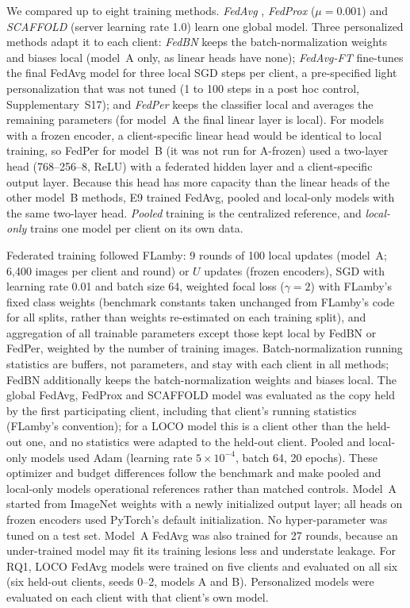\documentclass[VANCOUVER,Times1COL]{WileyNJDv5}
\begin{document}
We compared up to eight training methods. \emph{FedAvg} \cite{mcmahan2017fedavg}, \emph{FedProx}
\cite{li2020fedprox} ($\mu=0.001$) and \emph{SCAFFOLD} \cite{karimireddy2020scaffold} (server learning
rate 1.0) learn one global model. Three personalized methods adapt it to each client:
\emph{FedBN} \cite{li2021fedbn} keeps the batch-normalization weights and biases local (model~A only, as
linear heads have none); \emph{FedAvg-FT} fine-tunes the final FedAvg model for three local SGD steps per
client, a pre-specified light personalization that was not tuned (1 to 100 steps in a post hoc control,
Supplementary~S17); and \emph{FedPer}
\cite{arivazhagan2019fedper} keeps the classifier local and averages the remaining parameters (for
model~A the final linear layer is local). For models with a frozen encoder, a client-specific linear head
would be identical to local training, so FedPer for model~B (it was not run for A-frozen) used a two-layer head (768--256--8, ReLU) with a
federated hidden layer and a client-specific output layer. Because this head has more capacity than the
linear heads of the other model~B methods, E9 trained FedAvg, pooled and local-only models with the same
two-layer head. \emph{Pooled} training is the centralized reference, and \emph{local-only} trains one model
per client on its own data.

Federated training followed FLamby: 9 rounds of 100 local updates (model~A; 6,400 images per client and
round) or $U$ updates (frozen encoders), SGD with learning rate 0.01 and batch size 64, weighted focal loss
\cite{lin2017focal} ($\gamma=2$) with FLamby's fixed class weights (benchmark constants taken unchanged from FLamby's code for all splits, rather than weights re-estimated on each training split), and aggregation of all trainable parameters except those kept local by FedBN or FedPer, weighted by the number of training images.
Batch-normalization running statistics are buffers, not parameters, and stay with each client in all
methods; FedBN additionally keeps the batch-normalization weights and biases local. The global FedAvg,
FedProx and SCAFFOLD model was evaluated as the copy held by the first participating client, including
that client's running statistics (FLamby's convention); for a LOCO model this is a client other than the
held-out one, and no statistics were adapted to the held-out client. Pooled and local-only models used
Adam \cite{kingma2015adam} (learning rate $5\times10^{-4}$, batch 64, 20 epochs). These optimizer and
budget differences follow the benchmark and make pooled and local-only models operational references
rather than matched controls. Model~A started from ImageNet weights with a newly initialized output layer;
all heads on frozen encoders used PyTorch's default initialization. No hyper-parameter was tuned on a test
set. Model~A FedAvg was also trained for 27 rounds, because an under-trained model may fit its training
lesions less and understate leakage. For RQ1, LOCO FedAvg models were trained on five clients and
evaluated on all six (six held-out clients, seeds 0--2, models A and B). Personalized models were
evaluated on each client with that client's own model.
\end{document}
